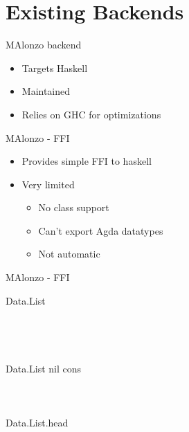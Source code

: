 \section{Existing Backends}
\begin{frame}{MAlonzo backend}
\begin{itemize}
\item Targets Haskell
\item Maintained
\item Relies on GHC for optimizations
\end{itemize}
\end{frame}


\begin{frame}{MAlonzo - FFI}
\begin{itemize}
\item Provides simple FFI to haskell
\item Very limited
  \begin{itemize}
    \item No class support
    \item Can't export Agda datatypes
    \item Not automatic
  \end{itemize}
\end{itemize}
\end{frame}

\begin{frame}[fragile]{MAlonzo - FFI}
\begin{code}%
\>\AgdaSymbol{\{-\#}  Data.List \AgdaSymbol{\#-\}}\<%
\\
%
\\
\>  \AgdaSymbol{:} \AgdaSymbol{(} \AgdaSymbol{:} \AgdaSymbol{)} \AgdaSymbol{->}  \<%
\\
\>[0]\<[2]%
\>[2] \AgdaSymbol{:}  \AgdaSymbol{\{}\AgdaSymbol{\}}   \<%
\\
\>[0]\<[2]%
\>[2] \AgdaSymbol{:}  \AgdaSymbol{\{}\AgdaSymbol{\}}        \<%
\\
\>\AgdaSymbol{\{-\#}   Data.List nil cons \AgdaSymbol{\#-\}}\<%
\\
%
\\
\>\<%
\\
\>[0]\<[2]%
\>[2] \AgdaSymbol{:}  \AgdaSymbol{\{}\AgdaSymbol{\}}    \AgdaSymbol{->} \<%
\\
\>\AgdaSymbol{\{-\#}   Data.List.head \AgdaSymbol{\#-\}}\<%
\\
\>\<%
\end{code}
\end{frame}

